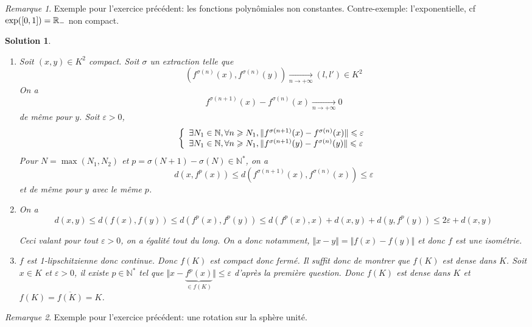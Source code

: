 \documentclass[12pt]{article}
\newtheorem{solution}{Solution}[section]
\theoremstyle{remark}
\newtheorem{remark}{Remarque}[section]
\newcommand{\N}{\mathbb{N}} \newcommand{\Z}{\mathbb{Z}}
\begin{document}
\begin{remark}
	Exemple pour l'exercice précédent: les fonctions polynômiales non constantes. Contre-exemple: l'exponentielle, cf $\exp([0,1])=\mathbb{R}_{-}$ non compact.
\end{remark}

\begin{solution}
	\phantom{}
	\begin{enumerate}
		\item 
		Soit $(x,y)\in K^{2}$ compact. Soit $\sigma$ un extraction telle que 
		$$(f^{\sigma(n)}(x),f^{\sigma(n)}(y))\xrightarrow[n\to+\infty]{}(l,l')\in K^{2}$$
		On a 
		$$f^{\sigma(n+1)}(x)-f^{\sigma(n)}(x)\xrightarrow[n\to+\infty]{}0$$
		de même pour $y$. Soit $\varepsilon>0$,
		$$
		\left\{
			\begin{array}[]{l}
				\exists N_{1}\in\N,\forall n\geqslant N_{1},\Vert f^{\sigma(n+1)}(x)-f^{\sigma(n)}(x)\Vert\leqslant\varepsilon\\
			\exists N_{1}\in\N,\forall n\geqslant N_{1},\Vert f^{\sigma(n+1)}(y)-f^{\sigma(n)}(y)\Vert\leqslant\varepsilon
		\end{array}
		\right.
		$$
		Pour $N=\max(N_{1},N_{2})$ et $p=\sigma(N+1)-\sigma(N)\in\N^{*}$, on a 
		\begin{equation*}
			d(x,f^{p}(x))\leqslant d(f^{\sigma(n+1)}(x),f^{\sigma(n)}(x))\leqslant\varepsilon
		\end{equation*}
		et de même pour $y$ avec le même $p$.
	
		\item On a 
		$$d(x,y)\leqslant d(f(x),f(y))\leqslant d(f^{p}(x),f^{p}(y))\leqslant d(f^{p}(x),x)+d(x,y)+d(y,f^{p}(y))\leqslant2\varepsilon+d(x,y)$$

		Ceci valant pour tout $\varepsilon>0$, on a égalité tout du long. On a donc notamment, $\Vert x-y\Vert=\Vert f(x)-f(y)\Vert$ et donc $f$ est une isométrie.

		\item $f$ est 1-lipschitzienne donc continue. Donc $f(K)$ est compact donc fermé. Il suffit donc de montrer que $f(K)$ est dense dans $K$. Soit $x\in K$ et $\varepsilon>0$, il existe $p\in\N^{*}$ tel que $\Vert x-\underbrace{f^{p}(x)}_{\in f(K)}\Vert\leqslant\varepsilon$ d'après la première question. Donc $f(K)$ est dense dans $K$ et $f(K)=\overline{f(K)}=K$.
	\end{enumerate}
\end{solution}

\begin{remark}
	Exemple pour l'exercice précédent: une rotation sur la sphère unité.
\end{remark}
\end{document}
